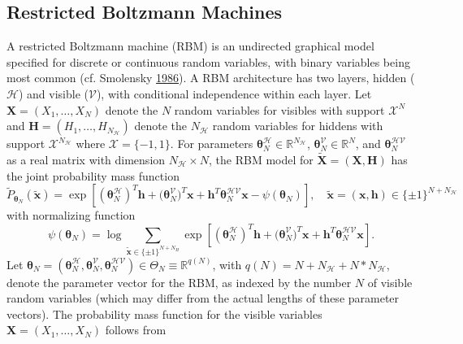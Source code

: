 \documentclass[]{article}
\theoremstyle{definition}
\begin{document}
\subsection{Restricted Boltzmann Machines}\label{rbm}

A restricted Boltzmann machine (RBM) is an undirected graphical model
specified for discrete or continuous random variables, with binary
variables being most common (cf. Smolensky
\protect\hyperlink{ref-smolensky1986information}{1986}). A RBM
architecture has two layers, hidden (\(\mathcal{H}\)) and visible
(\(\mathcal{V}\)), with conditional independence within each layer. Let
\(\boldsymbol X = (X_1,\ldots,X_N)\) denote the \(N\) random variables
for visibles with support \(\mathcal{X}^N\) and
\(\boldsymbol H = (H_1,\ldots,H_{N_\mathcal{H}})\) denote the
\(N_\mathcal{H}\) random variables for hiddens with support
\(\mathcal{X}^{N_\mathcal{H}}\) where \(\mathcal{X} = \{-1,1\}\). For
parameters
\(\boldsymbol \theta_N^{\mathcal{H}} \in \mathbb{R}^{N_\mathcal{H}}\),
\(\boldsymbol \theta_N^{\mathcal{V}}\in \mathbb{R}^N\), and
\(\boldsymbol \theta_N^{\mathcal{HV}}\) as a real matrix with dimension
\(N_\mathcal{H} \times N\), the RBM model for
\(\tilde{\boldsymbol X}=(\boldsymbol X,\boldsymbol H)\) has the joint
probability mass function
\begin{equation}
\label{eq:RBM1}
\tilde{P}_{\boldsymbol \theta_N} (\tilde{\boldsymbol x}) = \exp\left[ (\boldsymbol \theta_N^{\mathcal{H}})^T \boldsymbol h + \boldsymbol (\boldsymbol \theta_N^{\mathcal{V}})^T \boldsymbol x + \boldsymbol h^T  \boldsymbol\theta_N^{\mathcal{HV}} \boldsymbol x - \psi(\boldsymbol \theta_N)\right], \quad \tilde{\boldsymbol x} = (\boldsymbol x, \boldsymbol h) \in \{\pm 1\}^{N+N_\mathcal{H}}
\end{equation}
with normalizing function \[
\psi(\boldsymbol \theta_N) = \log \sum_{\tilde{\boldsymbol x} \in \{\pm 1\}^{N+N_H} } \exp\left[ (\boldsymbol \theta_N^{\mathcal{H}})^T \boldsymbol h + \boldsymbol (\boldsymbol \theta_N^{\mathcal{V}})^T \boldsymbol x + \boldsymbol h^T  \boldsymbol\theta_N^{\mathcal{HV}} \boldsymbol x\right].
\] Let
\(\boldsymbol \theta_N = (\boldsymbol \theta_N^{\mathcal{H}}, \boldsymbol \theta_N^{\mathcal{V}}, \boldsymbol\theta_N^{\mathcal{HV}} ) \in \Theta_N \equiv \mathbb{R}^{q(N)}\),
with \(q(N) = N + N_\mathcal{H} + N*N_\mathcal{H}\), denote the
parameter vector for the RBM, as indexed by the number \(N\) of visible
random variables (which may differ from the actual lengths of these
parameter vectors). The probability mass function for the visible
variables \(\boldsymbol X = (X_1, \dots, X_N)\) follows from
\end{document}
